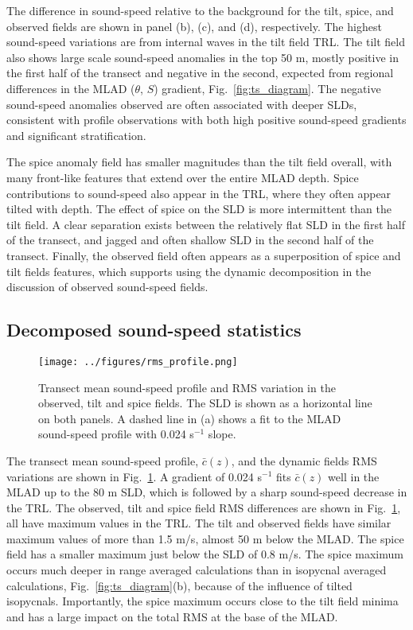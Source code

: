 \documentclass[preprint,NumberedRefs]{JASA}
\begin{document}
The difference in sound-speed relative to the background for the tilt, spice, and observed fields are shown in panel (b), (c), and (d), respectively. The highest sound-speed variations are from internal waves in the tilt field TRL. The tilt field also shows large scale sound-speed anomalies in the top 50 m, mostly positive in the first half of the transect and negative in the second, expected from regional differences in the MLAD ($\theta$, $S$) gradient, Fig.~\ref{fig:ts_diagram}. The negative sound-speed anomalies observed are often associated with deeper SLDs, consistent with profile observations with both high positive sound-speed gradients and significant stratification.\cite{colosi2020observations}

The spice anomaly field has smaller magnitudes than the tilt field overall, with many front-like features that extend over the entire MLAD depth. Spice contributions to sound-speed also appear in the TRL, where they often appear tilted with depth. The effect of spice on the SLD is more intermittent than the tilt field. A clear separation exists between the relatively flat SLD in the first half of the transect, and jagged and often shallow SLD in the second half of the transect. Finally, the observed field often appears as a superposition of spice and tilt fields features, which supports using the dynamic decomposition in the discussion of observed sound-speed fields.

\subsection{Decomposed sound-speed statistics}\label{ssec:decomp}
\begin{figure}
\texttt{[image: ../figures/rms\_profile.png]}
        \caption{\label{fig:c_rms}{Transect mean sound-speed profile and RMS variation in the observed, tilt and spice fields. The SLD is shown as a horizontal line on both panels. A dashed line in (a) shows a fit to the MLAD sound-speed profile with 0.024 s$^{-1}$ slope.}}
\end{figure}

The transect mean sound-speed profile, $\bar{c}(z)$, and the dynamic fields RMS variations are shown in Fig.~\ref{fig:c_rms}. A gradient of 0.024 s$^{-1}$ fits $\bar{c}(z)$ well in the MLAD up to the 80 m SLD, which is followed by a sharp sound-speed decrease in the TRL. The observed, tilt and spice field RMS differences are shown in Fig.~\ref{fig:c_rms}, all have maximum values in the TRL. The tilt and observed fields have similar maximum values of more than 1.5 m/s, almost 50 m below the MLAD. The spice field has a smaller maximum just below the SLD of 0.8 m/s. The spice maximum occurs much deeper in range averaged calculations than in isopycnal averaged calculations, Fig.~\ref{fig:ts_diagram}(b), because of the influence of tilted isopycnals.\citep{ferrari2000} Importantly, the spice maximum occurs close to the tilt field minima and has a large impact on the total RMS at the base of the MLAD.
\end{document}
